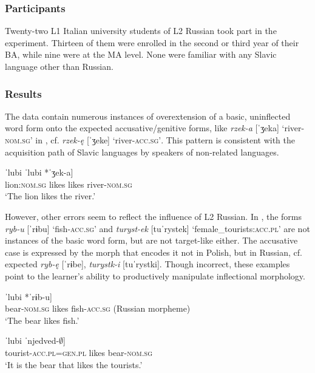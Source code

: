 \documentclass[output=paper,            colorlinks, citecolor=brown            		  ]{langscibook}
\begin{document}
\subsubsection{Participants}\label{sec:saturno:3.2.2}

Twenty-two L1 Italian university students of L2 Russian took part in the experiment. Thirteen of them were enrolled in the second or third year of their BA, while nine were at the MA level. None were familiar with any Slavic language other than Russian. 

\subsubsection{Results}\label{sec:saturno:3.2.3}

The data contain numerous instances of overextension of a basic, uninflected word form onto the expected accusative/genitive forms, like \textit{rzek-a} [ˈʒeka] ‘river-\textsc{nom.sg’} in , cf. \textit{rzek-ę} [ˈʒeke] ‘river-\textsc{acc.sg’}. This pattern is consistent with the acquisition path of Slavic languages by speakers of non-related languages.

\ea\label{ex:saturno:20} 
\gll {[Lev}     ˈlubi   ˈlubi   {*ˈʒek-a]} \\
lion:\textsc{nom.sg}   likes   likes   river-\textsc{nom.sg} \\ 
\glt ‘The lion likes the river.’
\z

However, other errors seem to reflect the influence of L2 Russian. In , the forms \textit{ryb-u} [ˈrɨbu] ‘fish-\textsc{acc.sg}’ and \textit{turyst-ek} [tuˈrystek] ‘female\_tourists:\textsc{acc.pl}’ are not instances of the basic word form, but are not target-like either. The accusative case is expressed by the morph that encodes it not in Polish, but in Russian, cf. expected \textit{ryb-ę} [ˈrɨbe], \textit{turystk-i} [tuˈrystki]. Though incorrect, these examples point to the learner’s ability to productively manipulate inflectional morphology. 

\ea\label{ex:saturno:21}  
    \ea\label{ex:saturno:21a} 
    \gll {[ˈnjedved-${\emptyset}$}   ˈlubi   {*ˈrɨb-u]}\\
    bear-\textsc{nom.sg}   likes   {fish-\textsc{acc.sg} (Russian morpheme)}\\ 
    \glt ‘The bear likes fish.’

    \ex\label{ex:saturno:21b} 
    \gll {[*tuˈryst-ek}       ˈlubi   {ˈnjedved-${\emptyset}$]}\\
    tourist-\textsc{acc.pl}=\textsc{gen.pl}  likes  bear-\textsc{nom.sg}\\ 
    \glt ‘It is the bear that likes the tourists.’
    \z
\z
\end{document}
